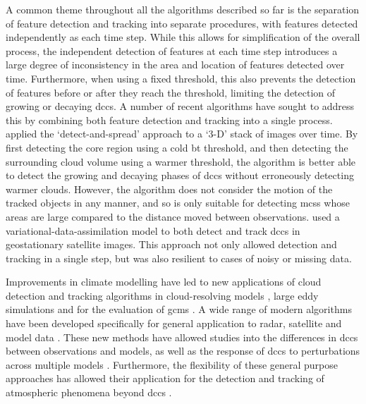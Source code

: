 A common theme throughout all the algorithms described so far is the separation of feature detection and tracking into separate procedures, with features detected independently as each time step.
While this allows for simplification of the overall process, the independent detection of features at each time step introduces a large degree of inconsistency in the area and location of features detected over time.
Furthermore, when using a fixed threshold, this also prevents the detection of features before or after they reach the threshold, limiting the detection of growing or decaying \acrshort{dcc}s.
A number of recent algorithms have sought to address this by combining both feature detection and tracking into a single process.
\citet{fiolleau_algorithm_2013} applied the `detect-and-spread' approach to a `3-D' stack of images over time.
By first detecting the core region using a cold \acrshort{bt} threshold, and then detecting the surrounding cloud volume using a warmer threshold, the algorithm is better able to detect the growing and decaying phases of \acrshort{dcc}s without erroneously detecting warmer clouds.
However, the algorithm does not consider the motion of the tracked objects in any manner, and so is only suitable for detecting \acrshort{mcs}s whose areas are large compared to the distance moved between observations.
\citet{thomas_data_2010} used a variational-data-assimilation model to both detect and track \acrshort{dcc}s in geostationary satellite images.
This approach not only allowed detection and tracking in a single step, but was also resilient to cases of noisy or missing data.

Improvements in climate modelling have led to new applications of cloud detection and tracking algorithms in cloud-resolving models \citep{plant_statistical_2009}, large eddy simulations \citep{dawe_statistical_2012a, heus_automated_2013} and for the evaluation of  \acrshort{gcm}s \citep{clark_application_2014}.
A wide range of modern algorithms have been developed specifically for general application to radar, satellite and model data \citep{heikenfeld_tobac_2019, ullrich_tempestextremes_2017, ullrich_tempestextremes_2021, raut_adaptive_2021, feng_pyflextrkr_2023}.
These new methods have allowed studies into the differences in \acrshort{dcc}s between observations and models, as well as the response of \acrshort{dcc}s to perturbations across multiple models \citep{marinescu_impacts_2021, feng_mesoscale_2023}.
Furthermore, the flexibility of these general purpose approaches has allowed their application for the detection and tracking of atmospheric phenomena beyond \acrshort{dcc}s \citep{bukowski_direct_2021, zhang_spaceborne_2023}.


